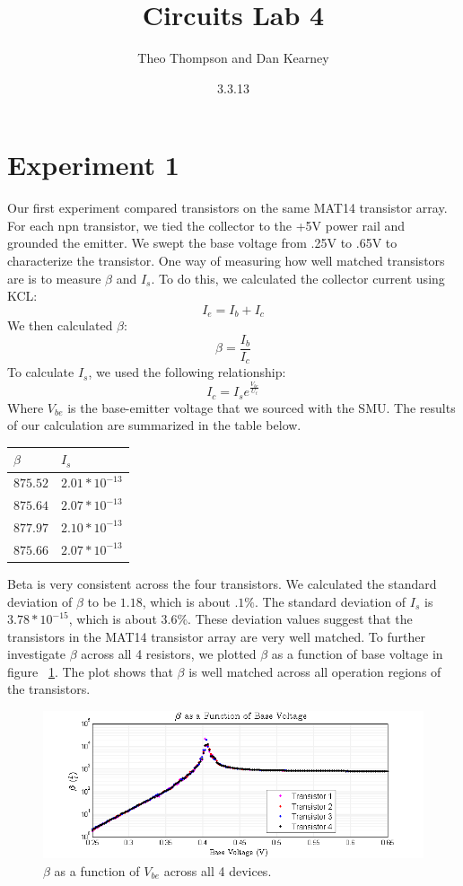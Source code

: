 \documentclass{article}
\title{Circuits Lab 4}
\author{Theo Thompson and Dan Kearney}
\date{3.3.13}
\begin{document}
\maketitle

\section*{Experiment 1}

Our first experiment compared transistors on the same MAT14 transistor array. For each npn transistor, we tied the collector to the +5V power rail and grounded the emitter. We swept the base voltage from .25V to .65V to characterize the transistor. One way of measuring how well matched transistors are is to measure $\beta$ and $I_{s}$. To do this, we calculated the collector current using KCL: \[I_{e}=I_{b}+I_{c}\]
We then calculated $\beta$:\[\beta=\frac{I_{b}}{I_{c}}\]
To calculate $I_{s}$, we used the following relationship: \[I_{c}=I_{s}e^{\frac{V_{be}}{U_{t}}}\]
Where $V_{be}$ is the base-emitter voltage that we sourced with the SMU. The results of our calculation are summarized in the table below.
\begin{center}
    \begin{tabular}{| l | l |} \hline
    $\beta$ & $I_{s}$ \\ \hline \hline
    $875.52$ & $2.01*10^{-13}$ \\ \hline
    $875.64$ & $2.07*10^{-13}$\\ \hline
    $877.97$ & $2.10*10^{-13}$ \\ \hline
    $875.66$ & $2.07*10^{-13}$ \\ \hline
    \end{tabular}
\end{center}

Beta is very consistent across the four transistors. We calculated the standard deviation of $\beta$ to be $1.18$, which is about $.1\%$. The standard deviation of $I_{s}$ is $3.78*10^{-15}$, which is about $3.6\%$. These deviation values suggest that the transistors in the MAT14 transistor array are very well matched. To further investigate $\beta$ across all 4 resistors, we plotted $\beta$ as a function of base voltage in figure ~\ref{fig:exp1c}. The plot shows that $\beta$ is well matched across all operation regions of the transistors.
\begin{figure}[H]
\begin{center}
\includegraphics[scale=.8]{exp1c.png}
\caption{$\beta$ as a function of $V_{be}$ across all 4 devices.}
\label{fig:exp1c}
\end{center}
\end{figure}
\end{document}
